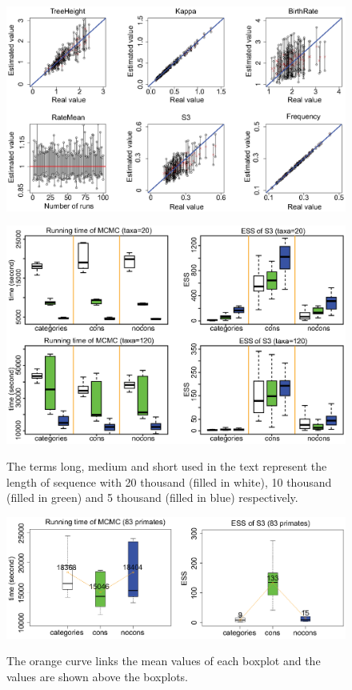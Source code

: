\documentclass{bmcart}
\begin{document}
\begin{backmatter}
\begin{figure}[h!]
\includegraphics[width=12cm]{Fig13-largetree.eps}\\
\caption{
             }
\label{LargeTree}
\end{figure}

\begin{figure}[h!]
\includegraphics[width=12cm]{Fig14-efficiency.eps}\\
\caption{
                   The terms long, medium and short used in the text represent the length of sequence with 20 thousand (filled in white), 10 thousand (filled in green) and 5 thousand (filled in blue) respectively.}
\label{eff_comp}
\end{figure}

\begin{figure}[h!]
\includegraphics[width=12cm]{Fig15-primates.eps}\\
\caption{
             The orange curve links the mean values of each boxplot and the values are shown above the boxplots.}
\label{eff_comp2}
\end{figure}


\end{backmatter}
\end{document}
